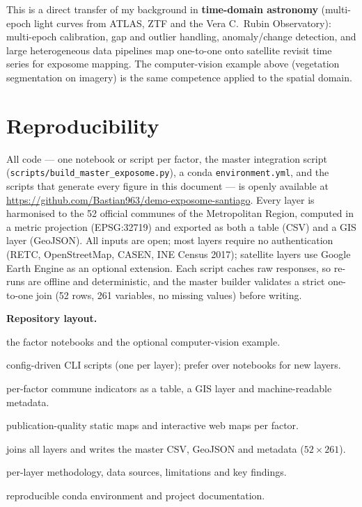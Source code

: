 \documentclass[10pt,a4paper]{article}
\begin{document}
This is a direct transfer of my background in \textbf{time-domain astronomy} (multi-epoch light curves from ATLAS, ZTF and the Vera C.\ Rubin Observatory): multi-epoch calibration, gap and outlier handling, anomaly/change detection, and large heterogeneous data pipelines map one-to-one onto satellite revisit time series for exposome mapping. The computer-vision example above (vegetation segmentation on imagery) is the same competence applied to the spatial domain.

\section{Reproducibility}

All code --- one notebook or script per factor, the master integration script (\texttt{scripts/\allowbreak build\_master\_\allowbreak exposome.py}), a conda \texttt{environment.yml}, and the scripts that generate every figure in this document --- is openly available at \url{https://github.com/Bastian963/demo-exposome-santiago}. Every layer is harmonised to the 52 official communes of the Metropolitan Region, computed in a metric projection (EPSG:32719) and exported as both a table (CSV) and a GIS layer (GeoJSON). All inputs are open; most layers require no authentication (RETC, OpenStreetMap, CASEN, INE Census 2017); satellite layers use Google Earth Engine as an optional extension. Each script caches raw responses, so re-runs are offline and deterministic, and the master builder validates a strict one-to-one join (52 rows, 261 variables, no missing values) before writing.

\smallskip
\noindent\textbf{\textcolor{softpink}{Repository layout.}}
\begin{description}[leftmargin=0pt,labelsep=0.5em,itemsep=1.5pt,font=\ttfamily\small]
  \item[notebooks/santiago\_*.ipynb] the factor notebooks and the optional computer-vision example.
  \item[scripts/run\_*.py] config-driven CLI scripts (one per layer); prefer over notebooks for new layers.
  \item[data/processed/*.\{csv,geojson,json\}] per-factor commune indicators as a table, a GIS layer and machine-readable metadata.
  \item[figures/*\_santiago\_*.png \textnormal{,} maps/*\_santiago.html] publication-quality static maps and interactive web maps per factor.
  \item[scripts/build\_master\_exposome.py] joins all layers and writes the master CSV, GeoJSON and metadata ($52\times261$).
  \item[docs/*\_methodology.md] per-layer methodology, data sources, limitations and key findings.
  \item[environment.yml \textnormal{,} README.md] reproducible conda environment and project documentation.
\end{description}

\printbibliography[title={Data sources and references}]
\end{document}
